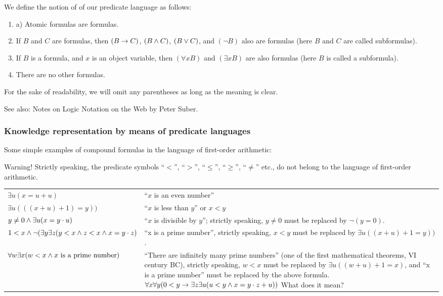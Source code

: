 We define the notion of  of our predicate language as follows:

\begin{enumerate}
    \item a) Atomic formulas are formulas.
    \item If \(B\) and \(C\) are formulas, then \((B\rightarrow C)\), \((B\wedge C)\), \((B\vee C)\), and \((\neg B)\) also are formulas (here \(B\) and \(C\) are called subformulas).
    \item If \(B\) is a formula, and \(x\) is an object variable, then \((\forall x B)\) and \((\exists x B)\) are also formulas (here \(B\) is called a subformula).
    \item There are no other formulas.
\end{enumerate}

\begin{remark}[]
For the sake of readability, we will omit any parentheses as long as the meaning is clear.
\end{remark}

See also:
Notes on Logic Notation on the Web by Peter Suber.

\subsubsection{Knowledge representation by means of predicate languages}

\begin{ex}[]
Some simple examples of compound formulas in the language of first-order arithmetic:

Warning! Strictly speaking, the predicate symbols ``\(<\)'', ``\(>\)'', ``\(\leq\)'', ``\(\geq\)'', ``\(\ne\)'' etc., do not belong to the language of first-order arithmetic.

\begin{center}
\begin{tabular}{p{7cm} p{8cm}}
\(\exists u(x=u+u)\)
& ``\(x\) is an even number'' \\
\(\exists u(((x+u)+1)=y))\)
& ``\(x\) is less than \(y\)'' or \(x<y\) \\
\(y\neq0 \wedge  \exists u(x=y\cdot u)\)
& ``\(x\) is divisible by \(y\)''; strictly speaking, \(y\neq0\) must be replaced by \(\neg(y=0)\). \\
\(1<x\wedge\neg (\exists y\exists z(y<x\wedge z<x\wedge x=y\cdot z)\)
& ``x is a prime number'', strictly speaking, \(x<y\) must be replaced by \(\exists u((x+u)+1=y))\). \\
\(\forall w\exists x(w<x\wedge x\text{ is a prime number})\)
& ``There are infinitely many prime numbers'' (one of the first mathematical theorems, VI century BC), strictly speaking, \(w<x\) must be replaced by \(\exists u((w+u)+1=x)\), and ``x is a prime number'' must be replaced by the above formula.
\(\forall x\forall y(0<y \rightarrow  \exists z\exists u(u<y \wedge  x=y\cdot z+u))\) What does it mean?
\end{tabular}
\end{center}
\end{ex}

